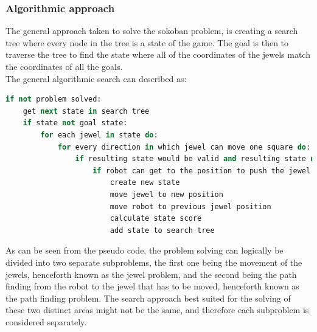 \subsubsection{Algorithmic approach}
The general approach taken to solve the sokoban problem, is creating a search tree where every node in the tree is a state of the game. The goal is then to traverse the tree to find the state where all of the coordinates of the jewels match the coordinates of all the goals.\\
The general algorithmic search can described as:

\begin{lstlisting}[language=Ruby, frame=single, basicstyle=\small, caption={Deadlock detection pseudo code}, label={code:sokoalgo}]
if not problem solved:
	get next state in search tree
	if state not goal state:
		for each jewel in state do:
			for every direction in which jewel can move one square do:
				if resulting state would be valid and resulting state not duplicate of a previous state:
					if robot can get to the position to push the jewel in the desired direction:
						create new state				
						move jewel to new position
						move robot to previous jewel position
						calculate state score
						add state to search tree	
\end{lstlisting}

As can be seen from the pseudo code, the problem solving can logically be divided into two separate subproblems, the first one being the movement of the jewels, henceforth known as the jewel problem, and the second being the path finding from the robot to the jewel that has to be moved, henceforth known as the path finding problem. 
The search approach best suited for the solving of these two distinct areas might not be the same, and therefore each subproblem is considered separately. 